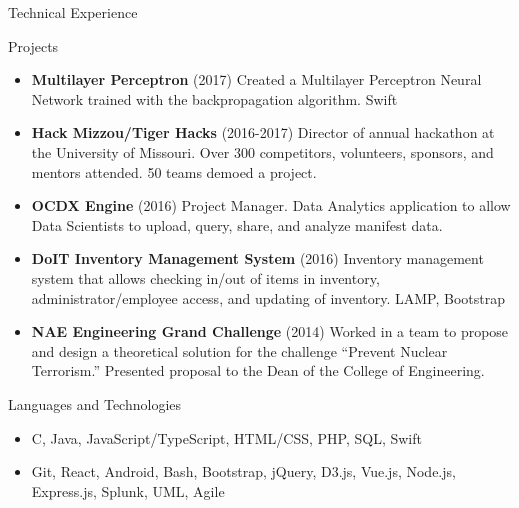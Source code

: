 \documentclass[]{mcdowellcv}
\begin{document}
    \begin{cvsection}{Technical Experience}
        \begin{cvsubsection}{Projects}{}{}
            \begin{itemize}
                \item \textbf{Multilayer Perceptron} (2017) Created a Multilayer Perceptron Neural Network trained with the backpropagation algorithm. Swift
                \item \textbf{Hack Mizzou/Tiger Hacks} (2016-2017) Director of annual hackathon at the University of Missouri. Over 300 competitors, volunteers, sponsors, and mentors attended. 50 teams demoed a project.
                \item \textbf{OCDX Engine} (2016) Project Manager. Data Analytics application to allow Data Scientists to upload, query, share, and analyze manifest data.
                \item \textbf{DoIT Inventory Management System} (2016) Inventory management system that allows checking in/out of items in inventory, administrator/employee access, and updating of inventory. LAMP, Bootstrap
                \item \textbf{NAE Engineering Grand Challenge} (2014) Worked in a team to propose and design a theoretical solution for the challenge “Prevent Nuclear Terrorism.” Presented proposal to the Dean of the College of Engineering.
            \end{itemize}
        \end{cvsubsection}

        \begin{cvsubsection}{Languages and Technologies}{}{}
            \begin{itemize}
                \item C, Java, JavaScript/TypeScript, HTML/CSS, PHP, SQL, Swift
                \item Git, React, Android, Bash, Bootstrap, jQuery, D3.js, Vue.js, Node.js, Express.js, Splunk, UML, Agile
            \end{itemize}
        \end{cvsubsection}
    \end{cvsection}
    
\end{document}
